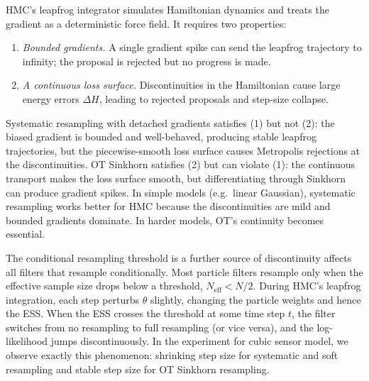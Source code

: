 \documentclass{article}
\begin{document}
HMC's leapfrog integrator simulates Hamiltonian dynamics and treats the gradient as a deterministic force field. It requires two properties:
\begin{enumerate}
    \item \textit{Bounded gradients.} A single gradient spike can send the leapfrog trajectory to infinity; the proposal is rejected but no progress is made.
    \item \textit{A continuous loss surface.} Discontinuities in the Hamiltonian cause large energy errors $\Delta H$, leading to rejected proposals and step-size collapse.
\end{enumerate}
Systematic resampling with detached gradients satisfies (1) but not (2): the biased gradient is bounded and well-behaved, producing stable leapfrog trajectories, but the piecewise-smooth loss surface causes Metropolis rejections at the discontinuities. OT Sinkhorn satisfies (2) but can violate (1): the continuous transport makes the loss surface smooth, but differentiating through Sinkhorn can produce gradient spikes. In simple models (e.g.\ linear Gaussian), systematic resampling works better for HMC because the discontinuities are mild and bounded gradients dominate. In harder models, OT's continuity becomes essential.

The conditional resampling threshold is a further source of discontinuity affects all filters that resample conditionally. Most particle filters resample only when the effective sample size drops below a threshold, $N_{\text{eff}} < N/2$. During HMC's leapfrog integration, each step perturbs $\theta$ slightly, changing the particle weights and hence the ESS. When the ESS crosses the threshold at some time step $t$, the filter switches from no resampling to full resampling (or vice versa), and the log-likelihood jumps discontinuously. In the experiment for cubic sensor model, we observe exactly this phenomenon: shrinking step size for systematic and soft resampling and stable step size for OT Sinkhorn resampling.

\end{document}
